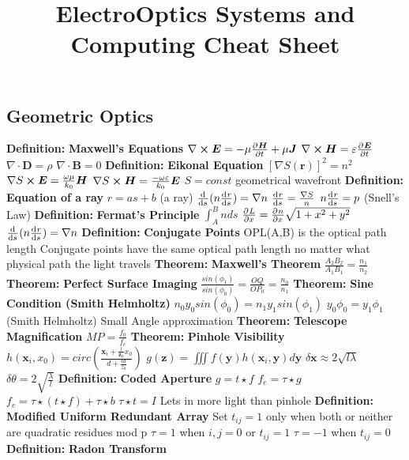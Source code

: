 \documentclass[14pt]{extarticle}
\title{ElectroOptics Systems and Computing Cheat Sheet}
\def\Definition{{\color{blue} \textbf{Definition:} }}
\def\Theorem{{\color{red} \textbf{Theorem:} }}
\begin{document}
\maketitle

\begin{outline}		
\section*{Geometric Optics}
	\1	\Definition \textbf{Maxwell's Equations}
		\2	$\nabla \cross \bm{E} = -\mu \pd{\bm{H}}{t} + \mu \bm{J}$
		\2	$\nabla \cross \bm{H} = \varepsilon \pd{\bm{E}}{t}$
		\2	$\nabla \cdot \bm{D} = \rho$
		\2	$\nabla \cdot \bm{B} = 0$
	\1	\Definition \textbf{Eikonal Equation}
		\2	$[\nabla S(\bm{r})]^2 = n^2$
		\2	$\nabla S \cross \bm{E} = \frac{\omega \mu}{k_0}\bm{H}$
		\2	$\nabla S \cross \bm{H} = \frac{-\omega \varepsilon}{k_0}\bm{E}$
		\2	$S = const$ geometrical wavefront
	\1	\Definition \textbf{Equation of a ray}
		\2	$r = as + b$ (a ray)	
		\2	$\od{}{s}(n \od{r}{s}) = \nabla n$
		\2	$\od{r}{s} = \frac{\nabla S}{n}$
		\2	$n \od{r}{s} = p$ (Snell's Law)
	\1	\Definition \textbf{Fermat's Principle}
		\2	$\int_A^B n ds$
		\2	$\pd{L}{x} = \pd{n}{x}\sqrt{1 + x^2 + y^2}$
		\2	$\od{}{s}(n \od{r}{s}) = \nabla n$
	\1	\Definition \textbf{Conjugate Points}
		\2	OPL(A,B) is the optical path length
		\2	Conjugate points have the same optical path length no matter what
				physical path the light travels
	\1	\Theorem \textbf{Maxwell's Theorem}
		\2	$\frac{A_2B_2}{A_1B_1} = \frac{n_1}{n_2}$
	\1	\Theorem \textbf{Perfect Surface Imaging}
		\2	$\frac{sin(\phi_1)}{sin(\phi_0)} = \frac{OQ}{OP_0} = \frac{n_0}{n_1}$
	\1	\Theorem \textbf{Sine Condition (Smith Helmholtz)}
		\2	$n_0 y_0 sin(\phi_0) = n_1 y_1 sin(\phi_1)$
		\2	$y_0 \phi_0 = y_1 \phi_1$ (Smith Helmholtz)
			\3 Small Angle approximation
	\1	\Theorem \textbf{Telescope Magnification}
		\2	$MP = \frac{f_0}{f_e}$
	\1	\Theorem \textbf{Pinhole Visibility}
		\2	$h(\bm{x}_i,x_0) = circ(\frac{\bm{x}_i + \frac{l}{\bm{z}_0}x_0}{d + \frac{ld}{z_0}})$
		\2	$g(\bm{z}) = \iiint f(\bm{y}) h(\bm{x}_i,\bm{y}) d\bm{y}$
		\2	$\delta \bm{x} \approx 2 \sqrt{l \lambda}$
		\2	$\delta \theta = 2 \sqrt{\frac{\lambda}{l}}$
	\1	\Definition \textbf{Coded Aperture}
		\2	$g = t \star f$
		\2	$f_e = \tau \star g$
		\2	$f_e = \tau \star (t \star f) + \tau \star b$
		\2	$\tau \star t = I$
		\2	Lets in more light than pinhole
	\1	\Definition \textbf{Modified Uniform Redundant Array}
		\2	Set $t_{ij} = 1$ only when both or neither are quadratic residues mod p
		\2	$\tau = 1$ when $i,j = 0$ or $t_{ij} = 1$
		\2	$\tau = -1$ when $t_{ij} = 0$
	\1	\Definition \textbf{Radon Transform}
	

\end{outline}
\end{document}
